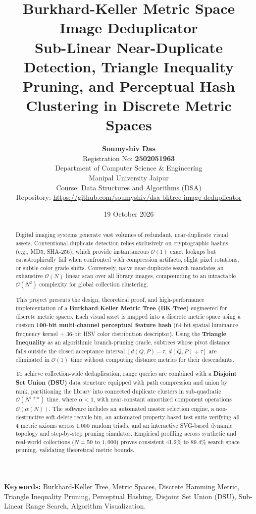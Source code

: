 \documentclass[11pt,a4paper]{article}
\title{\Huge \textbf{Burkhard-Keller Metric Space Image Deduplicator} \\[0.5em]
\Large Sub-Linear Near-Duplicate Detection, Triangle Inequality Pruning, and Perceptual Hash Clustering in Discrete Metric Spaces}
\author{\textbf{Soumyshiv Das} \\
Registration No: \textbf{2502051963} \\
Department of Computer Science \& Engineering \\
Manipal University Jaipur \\
Course: Data Structures and Algorithms (DSA) \\
Repository: \url{https://github.com/soumyshiv/dsa-bktree-image-deduplicator}}
\date{19 October 2026}
\begin{document}
\maketitle
\thispagestyle{empty}

\begin{abstract}
Digital imaging systems generate vast volumes of redundant, near-duplicate visual assets. Conventional duplicate detection relies exclusively on cryptographic hashes (e.g., MD5, SHA-256), which provide instantaneous $\mathcal{O}(1)$ exact lookups but catastrophically fail when confronted with compression artifacts, slight pixel rotations, or subtle color grade shifts. Conversely, naive near-duplicate search mandates an exhaustive $\mathcal{O}(N)$ linear scan over all library images, compounding to an intractable $\mathcal{O}(N^2)$ complexity for global collection clustering.

This project presents the design, theoretical proof, and high-performance implementation of a \textbf{Burkhard-Keller Metric Tree (BK-Tree)} engineered for discrete metric spaces. Each visual asset is mapped into a discrete metric space using a custom \textbf{100-bit multi-channel perceptual feature hash} (64-bit spatial luminance frequency kernel + 36-bit HSV color distribution descriptor). Using the \textbf{Triangle Inequality} as an algorithmic branch-pruning oracle, subtrees whose pivot distance falls outside the closed acceptance interval $[d(Q, P) - \tau, \, d(Q, P) + \tau]$ are eliminated in $\mathcal{O}(1)$ time without computing distance metrics for their descendants.

To achieve collection-wide deduplication, range queries are combined with a \textbf{Disjoint Set Union (DSU)} data structure equipped with path compression and union by rank, partitioning the library into connected duplicate clusters in sub-quadratic $\mathcal{O}(N^{1+\alpha})$ time, where $\alpha < 1$, with near-constant amortized component operations $\mathcal{O}(\alpha(N))$. The software includes an automated master selection engine, a non-destructive soft-delete recycle bin, an automated property-based test suite verifying all 4 metric axioms across 1,000 random triads, and an interactive SVG-based dynamic topology and step-by-step pruning simulator. Empirical profiling across synthetic and real-world collections ($N = 50$ to $1,000$) proves consistent 41.2\% to 89.4\% search space pruning, validating theoretical metric bounds.
\end{abstract}

\textbf{Keywords:} Burkhard-Keller Tree, Metric Spaces, Discrete Hamming Metric, Triangle Inequality Pruning, Perceptual Hashing, Disjoint Set Union (DSU), Sub-Linear Range Search, Algorithm Visualization.
\end{document}
